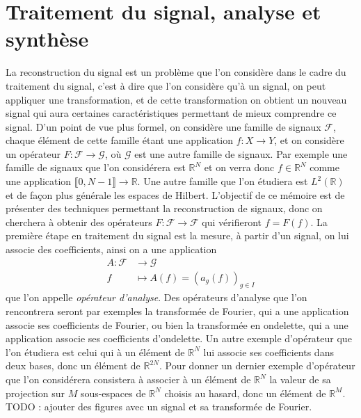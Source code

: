 \section{Traitement du signal, analyse et synthèse}
La reconstruction du signal est un problème que l'on considère dans le cadre du traitement du signal, c'est à dire que l'on considère qu'à un signal, on peut appliquer une transformation, et de cette transformation on obtient un nouveau signal qui aura certaines caractéristiques permettant de mieux comprendre ce signal.
D'un point de vue plus formel, on considère une famille de signaux $\mathcal{F}$, chaque élément de cette famille étant une application $f : X \longrightarrow Y$, et on considère un opérateur $F : \mathcal{F} \longrightarrow \mathcal{G}$, où $\mathcal{G}$ est une autre famille de signaux.
\newline
Par exemple une famille de signaux que l'on considérera est $\mathbb{R}^N$ et on verra donc $f\in \mathbb{R}^N$ comme une application $\llbracket 0,N-1 \rrbracket \rightarrow \mathbb{R}$.
Une autre famille que l'on étudiera est $L^2(\mathbb{R})$ et de façon plus générale les espaces de Hilbert. 
\newline
L'objectif de ce mémoire est de présenter des techniques permettant la reconstruction de signaux, donc on cherchera à obtenir des opérateurs $F	:\mathcal{F} \rightarrow \mathcal{F}$ qui vérifieront $f=F(f)$. 
La première étape en traitement du signal est la mesure, à partir d'un signal, on lui associe des coefficients, ainsi on a une application
\begin{align}
	A : 	\mathcal{F} &\longrightarrow \mathcal{G} \\
		f &\longmapsto A(f) = (a_g(f))_{g\in I}
\end{align}
que l'on appelle \emph{opérateur d'analyse}.
\newline
Des opérateurs d'analyse que l'on rencontrera seront par exemples la transformée de Fourier, qui a une application associe ses coefficients de Fourier, ou bien la transformée en ondelette, qui a une application associe ses coefficients d'ondelette.
Un autre exemple d'opérateur que l'on étudiera est celui qui à un élément de $\mathbb{R}^N$ lui associe ses coefficients dans deux bases, donc un élément de $\mathbb{R}^{2N}$.
Pour donner un dernier exemple d'opérateur que l'on considérera consistera à associer à un élément de $\mathbb{R}^N$ la valeur de sa projection sur $M$ sous-espaces de $\mathbb{R}^N$ choisis au hasard, donc un élément de $\mathbb{R}^M$.
\newline 
TODO : ajouter des figures avec un signal et sa transformée de Fourier.

